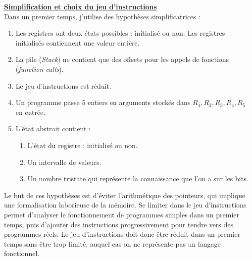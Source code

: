 \documentclass[a4paper,french, 12pt]{article}
\begin{document}
	\rhead{\today} 
	\cfoot{\thepage\ / \pageref{LastPage}}
	\noindent \begin{center}
		\end{center}
		
		\noindent\textbf{\underline{Simplification et choix du jeu d'instructions}}\\

		Dans un premier temps, j'utilise des hypothèses simplificatrices :
		\begin{enumerate}
		\item Les registres ont deux états possibles : initialisé ou non. Les registres initialisés contiennent une valeur entière.
		\item La pile (\textit{Stack}) ne contient que des offsets pour les appels de fonctions (\textit{function calls}).
		\item Le jeu d'instructions est réduit.
		\item Un programme passe 5 entiers en arguments stockés dans $R_1, R_2, R_3 , R_4,  R_5$ en entrée.
		\item L'état abstrait contient : \begin{enumerate}
		\item L'état du registre : initialisé ou non.
		\item Un intervalle de valeurs.
		\item Un nombre tristate qui représente la connaissance que l'on a sur les bits.\\
		\end{enumerate}
		\end{enumerate}

		Le but de ces hypothèses est d'éviter l'arithmétique des pointeurs, qui implique une formalisation laborieuse de la mémoire.
		 Se limiter dans le jeu d'instructions permet d'analyser le fonctionnement de programmes simples dans un premier temps, puis d'ajouter des instructions progressivement pour tendre vers des programmes réels.
		 Le jeu d'instructions doit donc être réduit dans un premier temps sans être trop limité, auquel cas on ne représente pas un langage fonctionnel.\\
\end{document}
